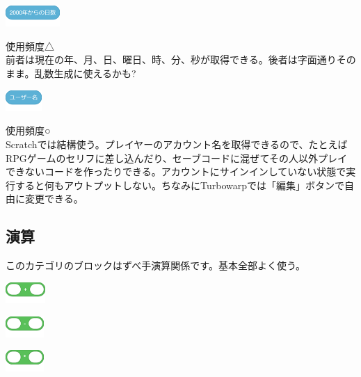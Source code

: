 \documentclass[b5paper,10pt]{jsarticle}
\begin{document}
\begin{multicols*}{3}
\begin{itembox}{12}
\includegraphics[height=8mm]{images/sensing_17.png}
\end{itembox}
使用頻度△\\
前者は現在の年、月、日、曜日、時、分、秒が取得できる。後者は字面通りそのまま。乱数生成に使えるかも?
\begin{itembox}{13}
\includegraphics[height=8mm]{images/sensing_18.png}
\end{itembox}
使用頻度○\\
Scratchでは結構使う。プレイヤーのアカウント名を取得できるので、たとえばRPGゲームのセリフに差し込んだり、セーブコードに混ぜてその人以外プレイできないコードを作ったりできる。アカウントにサインインしていない状態で実行すると何もアウトプットしない。ちなみにTurbowarpでは「編集」ボタンで自由に変更できる。

\subsection{演算}
このカテゴリのブロックはずべ手演算関係です。基本全部よく使う。
\begin{itembox}{1}
\includegraphics[height=8mm]{images/operators_1.png}

\includegraphics[height=8mm]{images/operators_2.png}

\includegraphics[height=8mm]{images/operators_3.png}


\end{itembox}
\end{multicols*}
\end{document}
